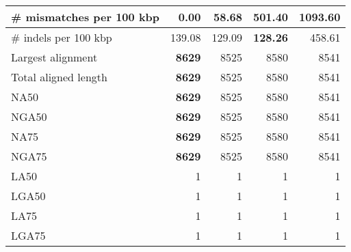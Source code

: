 \documentclass[12pt,a4paper]{article}
\begin{document}
\begin{table}[ht]
\begin{center}
\begin{tabular}{|l*{4}{|r}|}
\# mismatches per 100 kbp & {\bf 0.00} & 58.68 & 501.40 & 1093.60 \\ \hline
\# indels per 100 kbp & 139.08 & 129.09 & {\bf 128.26} & 458.61 \\ \hline
Largest alignment & {\bf 8629} & 8525 & 8580 & 8541 \\ \hline
Total aligned length & {\bf 8629} & 8525 & 8580 & 8541 \\ \hline
NA50 & {\bf 8629} & 8525 & 8580 & 8541 \\ \hline
NGA50 & {\bf 8629} & 8525 & 8580 & 8541 \\ \hline
NA75 & {\bf 8629} & 8525 & 8580 & 8541 \\ \hline
NGA75 & {\bf 8629} & 8525 & 8580 & 8541 \\ \hline
LA50 & 1 & 1 & 1 & 1 \\ \hline
LGA50 & 1 & 1 & 1 & 1 \\ \hline
LA75 & 1 & 1 & 1 & 1 \\ \hline
LGA75 & 1 & 1 & 1 & 1 \\ \hline
\end{tabular}
\end{center}
\end{table}
\end{document}
